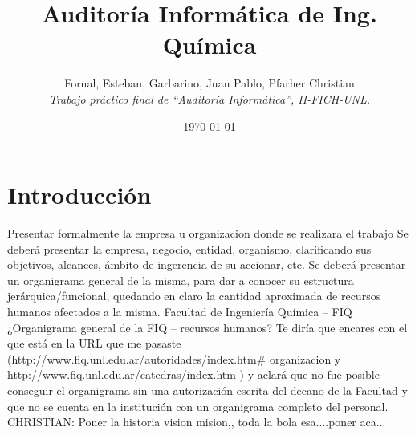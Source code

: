 \documentclass[10pt,a4paper,final]{article}
\begin{document}
\title{Auditoría Informática de Ing. Química}
\author{Fornal, Esteban, Garbarino, Juan Pablo, Pfarher Christian\\
\textit{Trabajo práctico final de ``Auditoría Informática'', II-FICH-UNL.}}
\date{\today}
\maketitle
\newpage
\tableofcontents
\newpage
\section{Introducción}
Presentar formalmente la empresa u organizacion donde se realizara el trabajo
Se deberá presentar la empresa, negocio, entidad, organismo, clarificando sus objetivos, alcances, ámbito de ingerencia de su accionar, etc.
Se deberá presentar un organigrama general de la misma, para dar a conocer su estructura jerárquica/funcional, quedando en claro la cantidad aproximada de recursos humanos afectados a la misma.
Facultad de Ingeniería Química – FIQ
¿Organigrama general de la FIQ – recursos humanos? Te diría que encares con el que está en la URL que me pasaste (http://www.fiq.unl.edu.ar/autoridades/index.htm\# organizacion y http://www.fiq.unl.edu.ar/catedras/index.htm ) y aclará que no fue posible conseguir el organigrama sin una autorización escrita del decano de la Facultad y que no se cuenta en la institución con un organigrama completo del personal.
CHRISTIAN: Poner la historia vision mision,, toda la bola esa....poner aca...
\end{document}
